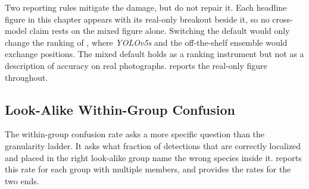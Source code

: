 Two reporting rules mitigate the damage, but do not repair it. Each headline figure in this chapter appears with its real-only breakout beside it, so no cross-model claim rests on the mixed figure alone. Switching the default would only change the ranking of , where \textit{YOLOv5s} and the off-the-shelf ensemble would exchange positions. The mixed default holds as a ranking instrument but not as a description of accuracy on real photographs.  reports the real-only figure throughout.

\subsection{Look-Alike Within-Group Confusion}\label{sec:results_lookalike_confusion}

The within-group confusion rate asks a more specific question than the granularity ladder. It asks what fraction of detections that are correctly localized and placed in the right look-alike group name the wrong species inside it.  reports this rate for each group with multiple members, and  provides the rates for the two ends.


